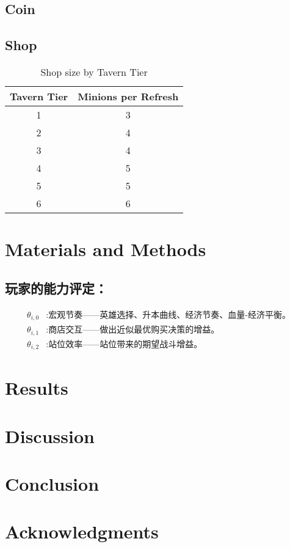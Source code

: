 \documentclass[UTF8]{ctexart}
\begin{document}
\subsection{Coin}

\subsection{Shop}

\begin{table}[ht]
  \centering
  \caption{Shop size by Tavern Tier}
  \label{tab:tier_shop_size}
  \begin{tabular}{cc}
    \toprule
    Tavern Tier & Minions per Refresh \\
    \midrule
     1 & 3 \\
     2 & 4 \\
     3 & 4 \\
     4 & 5 \\
     5 & 5 \\
     6 & 6 \\
    \bottomrule
  \end{tabular}
\end{table}

\section{Materials and Methods}

\subsection{}

\subsection{玩家的能力评定：}
\begin{align*}
  \theta_{i,0} &: \text{宏观节奏——英雄选择、升本曲线、经济节奏、血量-经济平衡。} \\
  \theta_{i,1} &: \text{商店交互——做出近似最优购买决策的增益。} \\
  \theta_{i,2} &: \text{站位效率——站位带来的期望战斗增益。}
\end{align*}

\section{Results}

\section{Discussion}

\section{Conclusion}

\section{Acknowledgments}
\end{document}
